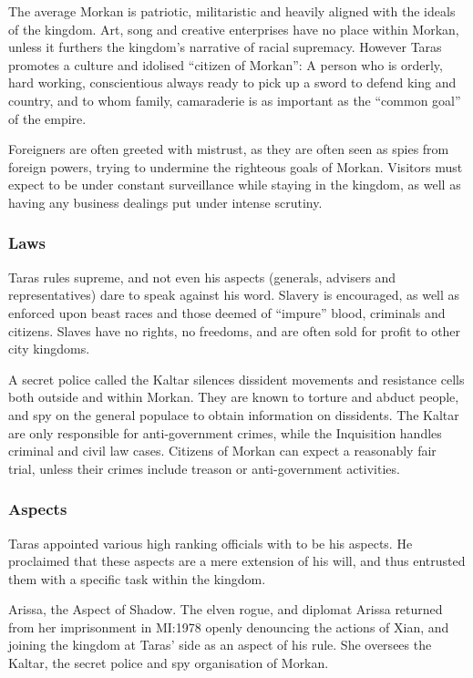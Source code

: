 The average Morkan is patriotic, militaristic and heavily aligned with the
ideals of the kingdom. Art, song and creative enterprises have no place within
Morkan, unless it furthers the kingdom's narrative of racial supremacy. However
Taras promotes a culture and idolised ``citizen of Morkan'': A person who is
orderly, hard working, conscientious always ready to pick up a sword to defend
king and country, and to whom family, camaraderie is as important as the
``common goal'' of the empire.

Foreigners are often greeted with mistrust, as they are often seen as spies
from foreign powers, trying to undermine the righteous goals of Morkan.
Visitors must expect to be under constant surveillance while staying in the
kingdom, as well as having any business dealings put under intense scrutiny.

\subsubsection{Laws}

Taras rules supreme, and not even his aspects (generals, advisers and
representatives) dare to speak against his word. Slavery is encouraged, as well
as enforced upon beast races and those deemed of ``impure'' blood, criminals
and citizens. Slaves have no rights, no freedoms, and are often sold for
profit to other city kingdoms.

A secret police called the Kaltar silences dissident movements and resistance
cells both outside and within Morkan. They are known to torture and abduct
people, and spy on the general populace to obtain information on dissidents.
The Kaltar are only responsible for anti-government crimes, while the
Inquisition handles criminal and civil law cases. Citizens of Morkan can
expect a reasonably fair trial, unless their crimes include treason or
anti-government activities.

\subsubsection{Aspects}

Taras appointed various high ranking officials with to be his aspects. He
proclaimed that these aspects are a mere extension of his will, and thus
entrusted them with a specific task within the kingdom.

Arissa, the Aspect of Shadow. The elven rogue, and diplomat Arissa returned
from her imprisonment in MI:1978 openly denouncing the actions of Xian, and
joining the kingdom at Taras' side as an aspect of his rule. She oversees the
Kaltar, the secret police and spy organisation of Morkan.


